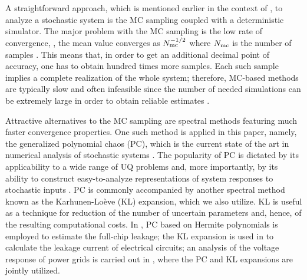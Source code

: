 
A straightforward approach, which is mentioned earlier in the context of \cite{chandra2010}, to analyze a stochastic system is the MC sampling coupled with a deterministic simulator. The major problem with the MC sampling is the low rate of convergence, \eg, the mean value converges as $N_\text{mc}^{-{{1}/{2}}}$ where $N_\text{mc}$ is the number of samples \cite{xiu2010, maitre2010}. This means that, in order to get an additional decimal point of accuracy, one has to obtain hundred times more samples. Each such sample implies a complete realization of the whole system; therefore, MC-based methods are typically slow and often infeasible since the number of needed simulations can be extremely large in order to obtain reliable estimates \cite{diaz-emparanza2002}.

Attractive alternatives to the MC sampling are spectral methods \cite{xiu2010, maitre2010, ghanem1991} featuring much faster convergence properties. One such method is applied in this paper, namely, the generalized polynomial chaos (PC), which is the current state of the art in numerical analysis of stochastic systems \cite{xiu2010}. The popularity of PC is dictated by its applicability to a wide range of UQ problems and, more importantly, by its ability to construct easy-to-analyze representations of system responses to stochastic inputs \cite{eldred2009}. PC is commonly accompanied by another spectral method known as the Karhunen-Lo\`{e}ve (KL) expansion, which we also utilize. KL is useful as a technique for reduction of the number of uncertain parameters and, hence, of the resulting computational costs. In \cite{shen2009}, PC based on Hermite polynomials is employed to estimate the full-chip leakage; the KL expansion is used in \cite{bhardwaj2006} to calculate the leakage current of electrical circuits; an analysis of the voltage response of power grids is carried out in \cite{ghanta2006}, where the PC and KL expansions are jointly utilized.

